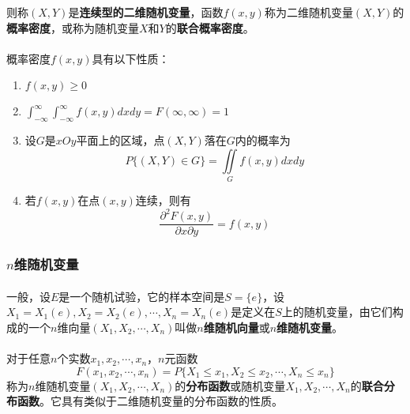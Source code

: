 则称$(X,Y)$是\textbf{连续型的二维随机变量}，函数$f(x,y)$称为二维随机变量$(X,Y)$的\textbf{概率密度}，或称为随机变量$X$和$Y$的\textbf{联合概率密度}。

\paragraph{}
概率密度$f(x,y)$具有以下性质：
\begin{enumerate}
  \item $f(x,y) \geq 0$
  \item $\int_{-\infty}^\infty\int_{-\infty}^\infty f(x,y)dxdy=F(\infty,\infty)=1$
  \item 设$G$是$xOy$平面上的区域，点$(X,Y)$落在$G$内的概率为
  \begin{equation}
    P\{(X,Y)\in G\} = \iint\limits_G f(x,y)dxdy
  \end{equation}
  \item 若$f(x,y)$在点$(x,y)$连续，则有
  \begin{equation}
    \frac{\partial^2F(x,y)}{\partial x\partial y} = f(x,y)
  \end{equation}
\end{enumerate}

\subsubsection{$n$维随机变量}
\paragraph{}
一般，设$E$是一个随机试验，它的样本空间是$S=\{e\}$，设$X_1=X_1(e), X_2=X_2(e),\cdots,X_n=X_n(e)$是定义在$S$上的随机变量，由它们构成的一个$n$维向量$(X_1,X_2,\cdots,X_n)$叫做\textbf{$n$维随机向量}或\textbf{$n$维随机变量}。
\paragraph{}
对于任意$n$个实数$x_1,x_2,\cdots,x_n$，$n$元函数
\begin{equation}
  F(x_1,x_2,\cdots,x_n)=P\{X_1 \leq  x_1, X_2 \leq x_2, \cdots, X_n \leq x_n\}
\end{equation}
称为$n$维随机变量$(X_1,X_2,\cdots,X_n)$的\textbf{分布函数}或随机变量$X_1,X_2,\cdots,X_n$的\textbf{联合分布函数}。它具有类似于二维随机变量的分布函数的性质。
